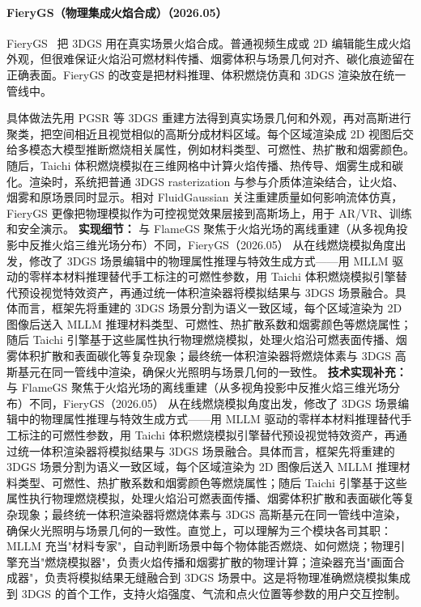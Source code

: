 \paragraph{FieryGS（物理集成火焰合成）（2026.05）}
FieryGS~\cite{2605_00177} 把 3DGS 用在真实场景火焰合成。普通视频生成或 2D 编辑能生成火焰外观，但很难保证火焰沿可燃材料传播、烟雾体积与场景几何对齐、碳化痕迹留在正确表面。FieryGS 的改变是把材料推理、体积燃烧仿真和 3DGS 渲染放在统一管线中。

具体做法先用 PGSR 等 3DGS 重建方法得到真实场景几何和外观，再对高斯进行聚类，把空间相近且视觉相似的高斯分成材料区域。每个区域渲染成 2D 视图后交给多模态大模型推断燃烧相关属性，例如材料类型、可燃性、热扩散和烟雾颜色。随后，Taichi 体积燃烧模拟在三维网格中计算火焰传播、热传导、烟雾生成和碳化。渲染时，系统把普通 3DGS rasterization 与参与介质体渲染结合，让火焰、烟雾和原场景同时显示。相对 FluidGaussian 关注重建质量如何影响流体仿真，FieryGS 更像把物理模拟作为可控视觉效果层接到高斯场上，用于 AR/VR、训练和安全演示。
\textbf{实现细节：} 与 FlameGS 聚焦于火焰光场的离线重建（从多视角投影中反推火焰三维光场分布）不同，FieryGS（2026.05） 从在线燃烧模拟角度出发，修改了 3DGS 场景编辑中的物理属性推理与特效生成方式——用 MLLM 驱动的零样本材料推理替代手工标注的可燃性参数，用 Taichi 体积燃烧模拟引擎替代预设视觉特效资产，再通过统一体积渲染器将模拟结果与 3DGS 场景融合。具体而言，框架先将重建的 3DGS 场景分割为语义一致区域，每个区域渲染为 2D 图像后送入 MLLM 推理材料类型、可燃性、热扩散系数和烟雾颜色等燃烧属性；随后 Taichi 引擎基于这些属性执行物理燃烧模拟，处理火焰沿可燃表面传播、烟雾体积扩散和表面碳化等复杂现象；最终统一体积渲染器将燃烧体素与 3DGS 高斯基元在同一管线中渲染，确保火光照明与场景几何的一致性。
\textbf{技术实现补充：} 与 FlameGS 聚焦于火焰光场的离线重建（从多视角投影中反推火焰三维光场分布）不同，FieryGS（2026.05） 从在线燃烧模拟角度出发，修改了 3DGS 场景编辑中的物理属性推理与特效生成方式——用 MLLM 驱动的零样本材料推理替代手工标注的可燃性参数，用 Taichi 体积燃烧模拟引擎替代预设视觉特效资产，再通过统一体积渲染器将模拟结果与 3DGS 场景融合。具体而言，框架先将重建的 3DGS 场景分割为语义一致区域，每个区域渲染为 2D 图像后送入 MLLM 推理材料类型、可燃性、热扩散系数和烟雾颜色等燃烧属性；随后 Taichi 引擎基于这些属性执行物理燃烧模拟，处理火焰沿可燃表面传播、烟雾体积扩散和表面碳化等复杂现象；最终统一体积渲染器将燃烧体素与 3DGS 高斯基元在同一管线中渲染，确保火光照明与场景几何的一致性。直觉上，可以理解为三个模块各司其职：MLLM 充当"材料专家"，自动判断场景中每个物体能否燃烧、如何燃烧；物理引擎充当"燃烧模拟器"，负责火焰传播和烟雾扩散的物理计算；渲染器充当"画面合成器"，负责将模拟结果无缝融合到 3DGS 场景中。这是将物理准确燃烧模拟集成到 3DGS 的首个工作，支持火焰强度、气流和点火位置等参数的用户交互控制。

